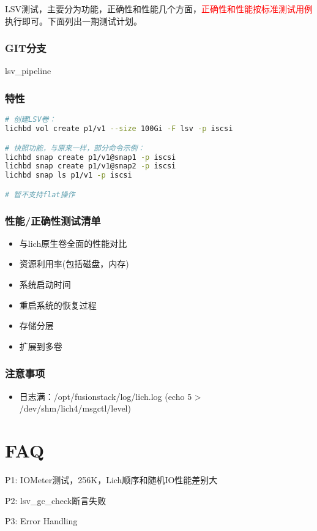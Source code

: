 \documentclass[UTF8]{ctexart}
\begin{document}
LSV测试，主要分为功能，正确性和性能几个方面，\textcolor{red}{正确性和性能按标准测试用例}执行即可。下面列出一期测试计划。

\subsubsection{GIT分支}

lsv\_pipeline

\subsubsection{特性}

\begin{lstlisting}[language=bash,frame=single]
# 创建LSV卷：
lichbd vol create p1/v1 --size 100Gi -F lsv -p iscsi

# 快照功能，与原来一样，部分命令示例：
lichbd snap create p1/v1@snap1 -p iscsi
lichbd snap create p1/v1@snap2 -p iscsi
lichbd snap ls p1/v1 -p iscsi

# 暂不支持flat操作

\end{lstlisting}

\subsubsection{性能/正确性测试清单}

\begin{itemize}
    \item 与lich原生卷全面的性能对比
    \item 资源利用率(包括磁盘，内存)
    \item 系统启动时间
    \item 重启系统的恢复过程
    \item 存储分层
    \item 扩展到多卷
\end{itemize}

\subsubsection{注意事项}

\begin{itemize}
    \item 日志满：/opt/fusionstack/log/lich.log (echo 5 > /dev/shm/lich4/msgctl/level)
\end{itemize}

\section{FAQ}

P1: IOMeter测试，256K，Lich顺序和随机IO性能差别大

P2: lsv\_gc\_check断言失败

P3: Error Handling
\end{document}
